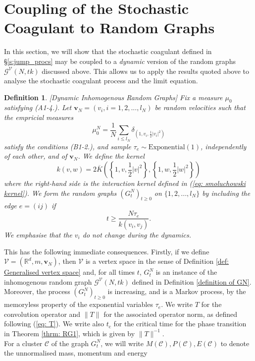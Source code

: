 \documentclass[11pt, notitlepage]{article}
\newcommand{\norm}[1]{|{#1}|}
\newtheorem{defn}{Definition}[section]
\begin{document}
\section{\textbf{Coupling of the Stochastic Coagulant to Random Graphs}} \label{sec: coupling_to_random_graph}
In this section, we will show that the stochastic coagulant defined in \S\ref{s:jump_procs} may be coupled to a \emph{dynamic} version of the random graphs $\mathcal{G}^\mathcal{V}(N,tk)$ discussed above. This allows us to apply the results quoted above to analyse the stochastic coagulant process and the limit equation.
\begin{defn}\label{def: GNT}[Dynamic Inhomogenous Random Graphs] Fix a measure $\mu_0$ satisfying (A1-4.). Let $\mathbf{v}_N=(v_i, i=1,2,...,l_N)$ be random velocities such that the empricial measures \begin{equation} \mu^N_0=\frac{1}{N}\sum_{i\le l_N} \delta_{(1,v_i,\frac{1}{2}|v_i|^2)}\end{equation}  satisfy the conditions (B1-2.), and sample $\tau_e \sim \text{Exponential}(1)$, independently of each other, and of $\mathbf{v}_N$. We define the kernel \begin{equation} k(v,w)=2\overline{K}\left(\left\{1,v, \frac{1}{2}\norm{v}^2\right\},\left\{1,w, \frac{1}{2}\norm{w}^2\right\}\right) \end{equation} where the right-hand side is the interaction kernel defined in (\ref{eq: smoluchowski kernel}). We form the random graphs $(G^N_t)_{t \ge 0}$ on $\{1,2,...,l_N\}$ by including the edge $e=(ij)$ if \begin{equation}
    t\ge \frac{N \tau_e}{k(v_i,v_j)}.
\end{equation} We emphasise that the $v_i$ do \emph{not} change during the dynamics. \end{defn} This has the following immediate consequences. Firstly, if we define $ \mathcal{V}=(\mathbb{R}^d, m, \mathbf{v}_N)$, then $\mathcal{V}$ is a vertex space in the sense of Definition \ref{def: Generalised vertex space} and, for all times $t$, $G^N_t$ is an instance of the inhomogenous random graph $\mathcal{G}^{\mathcal{V}}(N, tk)$ defined in Definition \ref{definition of GN}. Moreover, the process $(G^N_t)_{t\ge 0}$ is increasing, and is a Markov process, by the memoryless property of the exponential variables $\tau_e$.  We write $T$ for the convolution operator and $\|T\|$ for the associated operator norm, as defined following (\ref{eq: T}). We write also $t_\mathrm{c}$ for the critical time for the phase transition in Theorem \ref{thrm: RG1}, which is given by $\|T\|^{-1}$. \medskip \\ For a cluster $\mathcal{C}$ of the graph $G^N_t$, we will write $M(\mathcal{C}), P(\mathcal{C}), E(\mathcal{C})$ to denote the unnormalised mass, momentum and energy \begin{equation}\label{eq: cluster quantities}

\end{equation}
\end{document}
